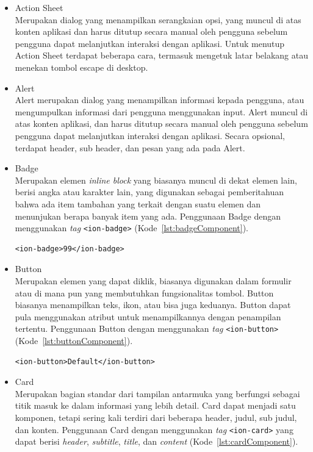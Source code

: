 \begin{itemize}
	\item Action Sheet \\
	Merupakan dialog yang menampilkan serangkaian opsi, yang muncul di atas konten aplikasi dan harus ditutup secara manual oleh pengguna sebelum pengguna dapat melanjutkan interaksi dengan aplikasi. Untuk menutup Action Sheet terdapat beberapa cara, termasuk mengetuk latar belakang atau menekan tombol escape di desktop.

	\item Alert \\
	Alert merupakan dialog yang menampilkan informasi kepada pengguna, atau mengumpulkan informasi dari pengguna menggunakan input. Alert muncul di atas konten aplikasi, dan harus ditutup secara manual oleh pengguna sebelum pengguna dapat melanjutkan interaksi dengan aplikasi. Secara opsional, terdapat header, sub header, dan pesan yang ada pada Alert.
	\item Badge \\
	Merupakan elemen {\it inline block} yang biasanya muncul di dekat elemen lain, berisi angka atau karakter lain, yang digunakan sebagai pemberitahuan bahwa ada item tambahan yang terkait dengan suatu elemen dan menunjukan berapa banyak item yang ada. Penggunaan Badge dengan menggunakan {\it tag} \texttt{<ion-badge>} (Kode~\ref{lst:badgeComponent}).
	\begin{lstlisting}[label={lst:badgeComponent}, caption=Potongan Kode Program dari Badge Component]
<ion-badge>99</ion-badge>
	\end{lstlisting} 
	\item Button \\
	Merupakan elemen yang dapat diklik, biasanya digunakan dalam formulir atau di mana pun yang membutuhkan fungsionalitas tombol. Button biasanya menampilkan teks, ikon, atau bisa juga keduanya. Button dapat pula menggunakan atribut untuk menampilkannya dengan penampilan tertentu. Penggunaan Button dengan menggunakan {\it tag} \texttt{<ion-button>} (Kode~\ref{lst:buttonComponent}). 
	\begin{lstlisting}[label={lst:buttonComponent}, caption=Potongan Kode Program dari Button Component]
<ion-button>Default</ion-button>
	\end{lstlisting} 
	
	\item Card \\
	Merupakan bagian standar dari tampilan antarmuka yang berfungsi sebagai titik masuk ke dalam informasi yang lebih detail. Card dapat menjadi satu komponen, tetapi sering kali terdiri dari beberapa header, judul, sub judul, dan konten. Penggunaan Card dengan menggunakan {\it tag} \texttt{<ion-card>} yang dapat berisi {\it header}, {\it subtitle}, {\it title}, dan {\it content} (Kode~\ref{lst:cardComponent}).


\end{itemize}
